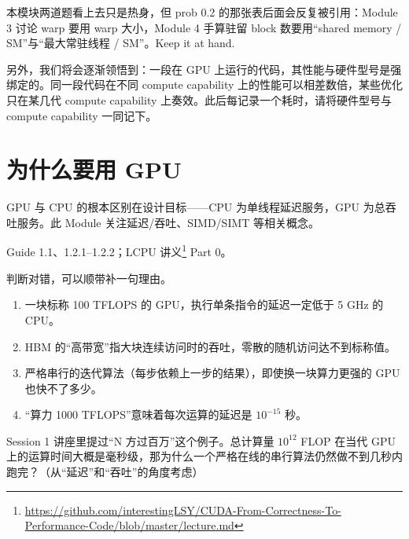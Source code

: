 \documentclass[11pt,a4paper,fontset=none]{ctexart}
\begin{document}
\begin{lookback}
本模块两道题看上去只是热身，但 prob 0.2 的那张表后面会反复被引用：Module 3 讨论 warp 要用 warp 大小，Module 4 手算驻留 block 数要用“shared memory / SM”与“最大常驻线程 / SM”。Keep it at hand.

另外，我们将会逐渐领悟到：一段在 GPU 上运行的代码，其性能与硬件型号是强绑定的。同一段代码在不同 compute capability 上的性能可以相差数倍，某些优化只在某几代 compute capability 上奏效。此后每记录一个耗时，请将硬件型号与 compute capability 一同记下。
\end{lookback}

\section{为什么要用 GPU}

GPU 与 CPU 的根本区别在设计目标——CPU 为单线程延迟服务，GPU 为总吞吐服务。此 Module 关注延迟/吞吐、SIMD/SIMT 等相关概念。

\begin{reading}
Guide 1.1、1.2.1--1.2.2；LCPU 讲义\footnote{\url{https://github.com/interestingLSY/CUDA-From-Correctness-To-Performance-Code/blob/master/lecture.md}} Part 0。
\end{reading}

判断对错，可以顺带补一句理由。
\begin{enumerate}[label=(\alph*)]
  \item 一块标称 100 TFLOPS 的 GPU，执行单条指令的延迟一定低于 5 GHz 的 CPU。
  \item HBM 的“高带宽”指大块连续访问时的吞吐，零散的随机访问达不到标称值。
  \item 严格串行的迭代算法（每步依赖上一步的结果），即使换一块算力更强的 GPU 也快不了多少。
  \item “算力 1000 TFLOPS”意味着每次运算的延迟是 $10^{-15}$ 秒。
\end{enumerate}

Session 1 讲座里提过“N 方过百万”这个例子。总计算量 $10^{12}$ FLOP 在当代 GPU 上的运算时间大概是毫秒级，那为什么一个严格在线的串行算法仍然做不到几秒内跑完？（从“延迟”和“吞吐”的角度考虑）
\end{document}
